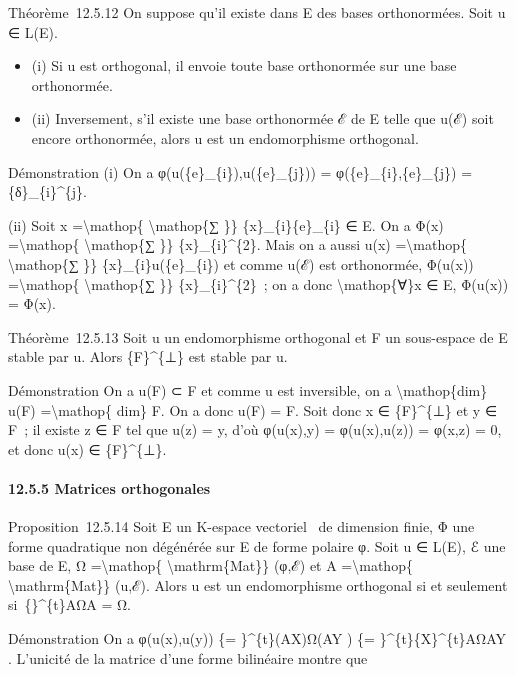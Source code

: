 \documentclass[]{article}
\begin{document}
Théorème~12.5.12 On suppose qu'il existe dans E des bases orthonormées.
Soit u ∈ L(E).

\begin{itemize}
\itemsep1pt\parskip0pt
\item
  (i) Si u est orthogonal, il envoie toute base orthonormée sur une base
  orthonormée.
\item
  (ii) Inversement, s'il existe une base orthonormée ℰ de E telle que
  u(ℰ) soit encore orthonormée, alors u est un endomorphisme orthogonal.
\end{itemize}

Démonstration (i) On a φ(u(\{e\}\_\{i\}),u(\{e\}\_\{j\})) =
φ(\{e\}\_\{i\},\{e\}\_\{j\}) = \{δ\}\_\{i\}\^{}\{j\}.

(ii) Soit x =\textbackslash{}mathop\{ \textbackslash{}mathop\{∑ \}\}
\{x\}\_\{i\}\{e\}\_\{i\} ∈ E. On a Φ(x) =\textbackslash{}mathop\{
\textbackslash{}mathop\{∑ \}\} \{x\}\_\{i\}\^{}\{2\}. Mais on a aussi
u(x) =\textbackslash{}mathop\{ \textbackslash{}mathop\{∑ \}\}
\{x\}\_\{i\}u(\{e\}\_\{i\}) et comme u(ℰ) est orthonormée, Φ(u(x))
=\textbackslash{}mathop\{ \textbackslash{}mathop\{∑ \}\}
\{x\}\_\{i\}\^{}\{2\}~; on a donc \textbackslash{}mathop\{∀\}x ∈ E,
Φ(u(x)) = Φ(x).

Théorème~12.5.13 Soit u un endomorphisme orthogonal et F un sous-espace
de E stable par u. Alors \{F\}\^{}\{⊥\} est stable par u.

Démonstration On a u(F) ⊂ F et comme u est inversible, on a
\textbackslash{}mathop\{dim\} u(F) =\textbackslash{}mathop\{ dim\} F. On
a donc u(F) = F. Soit donc x ∈ \{F\}\^{}\{⊥\} et y ∈ F~; il existe z ∈ F
tel que u(z) = y, d'où φ(u(x),y) = φ(u(x),u(z)) = φ(x,z) = 0, et donc
u(x) ∈ \{F\}\^{}\{⊥\}.

\paragraph{12.5.5 Matrices orthogonales}

Proposition~12.5.14 Soit E un K-espace vectoriel ~de dimension finie, Φ
une forme quadratique non dégénérée sur E de forme polaire φ. Soit u ∈
L(E), ℰ une base de E, Ω =\textbackslash{}mathop\{
\textbackslash{}mathrm\{Mat\}\} (φ,ℰ) et A =\textbackslash{}mathop\{
\textbackslash{}mathrm\{Mat\}\} (u,ℰ). Alors u est un endomorphisme
orthogonal si et seulement si~\{\}\^{}\{t\}AΩA = Ω.

Démonstration On a φ(u(x),u(y)) \{= \}\^{}\{t\}(AX)Ω(AY ) \{=
\}\^{}\{t\}\{X\}\^{}\{t\}AΩAY . L'unicité de la matrice d'une forme
bilinéaire montre que
\end{document}
